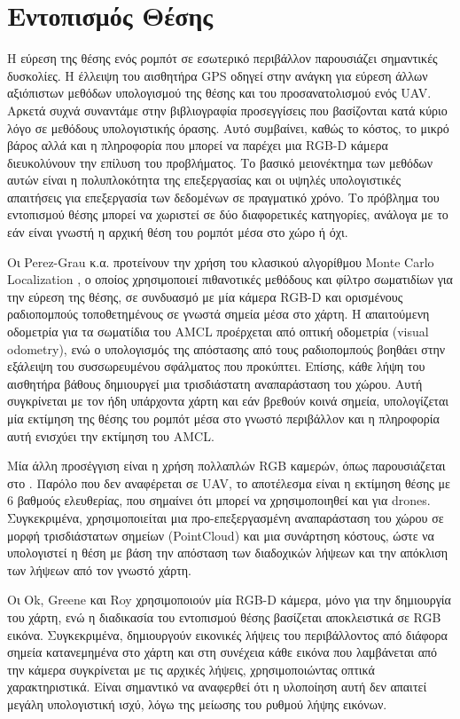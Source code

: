 \section{Εντοπισμός Θέσης}
\label{section:localization}

Η εύρεση της θέσης ενός ρομπότ σε εσωτερικό περιβάλλον παρουσιάζει σημαντικές δυσκολίες. Η έλλειψη του αισθητήρα GPS οδηγεί στην ανάγκη για εύρεση άλλων αξιόπιστων μεθόδων υπολογισμού της θέσης και του προσανατολισμού ενός UAV. Αρκετά συχνά συναντάμε στην βιβλιογραφία προσεγγίσεις που βασίζονται κατά κύριο λόγο σε μεθόδους υπολογιστικής όρασης. Αυτό συμβαίνει, καθώς το κόστος, το μικρό βάρος αλλά και η πληροφορία που μπορεί να παρέχει μια RGB-D κάμερα διευκολύνουν την επίλυση του προβλήματος. Το βασικό μειονέκτημα των μεθόδων αυτών είναι η πολυπλοκότητα της επεξεργασίας και οι υψηλές υπολογιστικές απαιτήσεις για επεξεργασία των δεδομένων σε πραγματικό χρόνο. Το πρόβλημα του εντοπισμού θέσης μπορεί να χωριστεί σε δύο διαφορετικές κατηγορίες, ανάλογα με το εάν είναι γνωστή η αρχική θέση του ρομπότ μέσα στο χώρο ή όχι. 

Οι Perez-Grau κ.α. \cite{francisco2017perez} προτείνουν την χρήση του κλασικού αλγορίθμου Monte Carlo Localization \cite{amcl}, ο οποίος χρησιμοποιεί πιθανοτικές μεθόδους και φίλτρο σωματιδίων για την εύρεση της θέσης, σε συνδυασμό με μία κάμερα RGB-D και ορισμένους ραδιοπομπούς τοποθετημένους σε γνωστά σημεία μέσα στο χάρτη. Η απαιτούμενη οδομετρία για τα σωματίδια του AMCL προέρχεται από οπτική οδομετρία (visual odometry), ενώ ο υπολογισμός της απόστασης από τους ραδιοπομπούς βοηθάει στην εξάλειψη του συσσωρευμένου σφάλματος που προκύπτει. Επίσης, κάθε λήψη του αισθητήρα βάθους δημιουργεί μια τρισδιάστατη αναπαράσταση του χώρου. Αυτή συγκρίνεται με τον ήδη υπάρχοντα χάρτη και εάν βρεθούν κοινά σημεία, υπολογίζεται μία εκτίμηση της θέσης του ρομπότ μέσα στο γνωστό περιβάλλον και η πληροφορία αυτή ενισχύει την εκτίμηση του AMCL.

Μία άλλη προσέγγιση είναι η χρήση πολλαπλών RGB καμερών, όπως παρουσιάζεται στο \cite{6224750}. Παρόλο που δεν αναφέρεται σε UAV, το αποτέλεσμα είναι η εκτίμηση θέσης με 6 βαθμούς ελευθερίας, που σημαίνει ότι μπορεί να χρησιμοποιηθεί και για drones. Συγκεκριμένα, χρησιμοποιείται μια προ-επεξεργασμένη αναπαράσταση του χώρου σε μορφή τρισδιάστατων σημείων (PointCloud) και μια συνάρτηση κόστους, ώστε να υπολογιστεί η θέση με βάση την απόσταση των διαδοχικών λήψεων και την απόκλιση των λήψεων από τον γνωστό χάρτη.

Οι Ok, Greene και Roy \cite{7487651} χρησιμοποιούν μία RGB-D κάμερα, μόνο για την δημιουργία του χάρτη, ενώ η διαδικασία του εντοπισμού θέσης βασίζεται αποκλειστικά σε RGB εικόνα. Συγκεκριμένα, δημιουργούν εικονικές λήψεις του περιβάλλοντος από διάφορα σημεία κατανεμημένα στο χάρτη και στη συνέχεια κάθε εικόνα που λαμβάνεται από την κάμερα συγκρίνεται με τις αρχικές λήψεις, χρησιμοποιώντας οπτικά χαρακτηριστικά. Είναι σημαντικό να αναφερθεί ότι η υλοποίηση αυτή δεν απαιτεί μεγάλη υπολογιστική ισχύ, λόγω της μείωσης του ρυθμού λήψης εικόνων.


